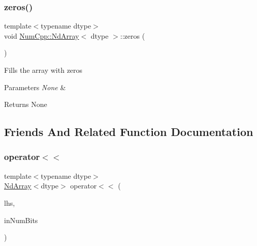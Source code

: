 \subsubsection{\texorpdfstring{zeros()}{zeros()}}
{\footnotesize\ttfamily template$<$typename dtype$>$ \\
void \mbox{\hyperlink{class_num_cpp_1_1_nd_array}{Num\+Cpp\+::\+Nd\+Array}}$<$ dtype $>$\+::zeros (\begin{DoxyParamCaption}{ }\end{DoxyParamCaption})\hspace{0.3cm}{\ttfamily [inline]}}

Fills the array with zeros


\begin{DoxyParams}{Parameters}
{\em None} & \\
\hline
\end{DoxyParams}
\begin{DoxyReturn}{Returns}
None 
\end{DoxyReturn}


\subsection{Friends And Related Function Documentation}
\mbox{\label{class_num_cpp_1_1_nd_array_ad870c7e142d724ed1a984e4e0998d871}} 
\subsubsection{\texorpdfstring{operator$<$$<$}{operator<<}\hspace{0.1cm}{\footnotesize\ttfamily [1/2]}}
{\footnotesize\ttfamily template$<$typename dtype$>$ \\
\mbox{\hyperlink{class_num_cpp_1_1_nd_array}{Nd\+Array}}$<$dtype$>$ operator$<$$<$ (\begin{DoxyParamCaption}\item[{const \mbox{\hyperlink{class_num_cpp_1_1_nd_array}{Nd\+Array}}$<$ dtype $>$ \&}]{lhs,  }\item[{\mbox{\hyperlink{namespace_num_cpp_aee396d0469d6031cd18118c0a45bcdda}{uint8}}}]{in\+Num\+Bits }\end{DoxyParamCaption})\hspace{0.3cm}{\ttfamily [friend]}}

